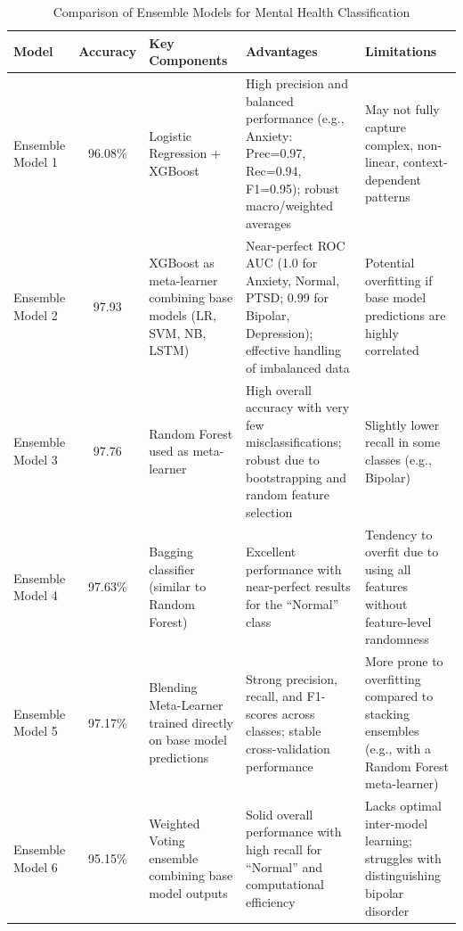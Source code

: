 \pagebreak

\begin{table}[H]
    \centering
    \caption*{Comparison of Ensemble Models for Mental Health Classification}
    \label{tab:ensemble_comparison}
    \begin{tabularx}{\textwidth}{|l|c|X|X|X|}
    \hline
    \textbf{Model} & \textbf{Accuracy} & \textbf{Key Components} & \textbf{Advantages} & \textbf{Limitations} \\
    \hline
    Ensemble Model 1 & 96.08\% & Logistic Regression + XGBoost & High precision and balanced performance (e.g., Anxiety: Prec=0.97, Rec=0.94, F1=0.95); robust macro/weighted averages & May not fully capture complex, non-linear, context-dependent patterns \\
    \hline
    Ensemble Model 2 & 97.93 & XGBoost as meta-learner combining base models (LR, SVM, NB, LSTM) & Near-perfect ROC AUC (1.0 for Anxiety, Normal, PTSD; 0.99 for Bipolar, Depression); effective handling of imbalanced data & Potential overfitting if base model predictions are highly correlated \\
    \hline
    Ensemble Model 3 & 97.76 & Random Forest used as meta-learner & High overall accuracy with very few misclassifications; robust due to bootstrapping and random feature selection & Slightly lower recall in some classes (e.g., Bipolar) \\
    \hline
    Ensemble Model 4 & 97.63\% & Bagging classifier (similar to Random Forest) & Excellent performance with near-perfect results for the “Normal” class & Tendency to overfit due to using all features without feature-level randomness \\
    \hline
    Ensemble Model 5 & 97.17\% & Blending Meta-Learner trained directly on base model predictions & Strong precision, recall, and F1-scores across classes; stable cross-validation performance & More prone to overfitting compared to stacking ensembles (e.g., with a Random Forest meta-learner) \\
    \hline
    Ensemble Model 6 & 95.15\% & Weighted Voting ensemble combining base model outputs & Solid overall performance with high recall for “Normal” and computational efficiency & Lacks optimal inter-model learning; struggles with distinguishing bipolar disorder \\
    \hline
\end{tabularx}
\end{table}

